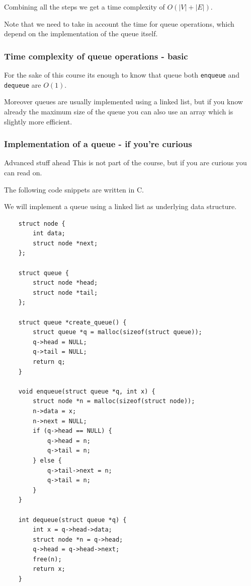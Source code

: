 \documentclass[10pt]{extarticle}
\begin{document}
Combining all the steps we get a time complexity of $O(|V| + |E|)$.

Note that we need to take in account the time for queue operations, which depend on the implementation of the queue itself.

\subsubsection{Time complexity of queue operations - basic}

For the sake of this course its enough to know that queue both \texttt{enqueue} and \texttt{dequeue} are $O(1)$.

Moreover queues are usually implemented using a linked list, but if you know already the maximum size of the queue you can also use an array which is slightly more efficient.

\subsubsection{Implementation of a queue - if you're curious}

\begin{warningbox}{Advanced stuff ahead}
    This is not part of the course, but if you are curious you can read on.

    The following code snippets are written in C.
\end{warningbox}

We will implement a queue using a linked list as underlying data structure.

\begin{verbatim}
    struct node {
        int data;
        struct node *next;
    };

    struct queue {
        struct node *head;
        struct node *tail;
    };

    struct queue *create_queue() {
        struct queue *q = malloc(sizeof(struct queue));
        q->head = NULL;
        q->tail = NULL;
        return q;
    }

    void enqueue(struct queue *q, int x) {
        struct node *n = malloc(sizeof(struct node));
        n->data = x;
        n->next = NULL;
        if (q->head == NULL) {
            q->head = n;
            q->tail = n;
        } else {
            q->tail->next = n;
            q->tail = n;
        }
    }

    int dequeue(struct queue *q) {
        int x = q->head->data;
        struct node *n = q->head;
        q->head = q->head->next;
        free(n);
        return x;
    }
\end{verbatim}
\end{document}
